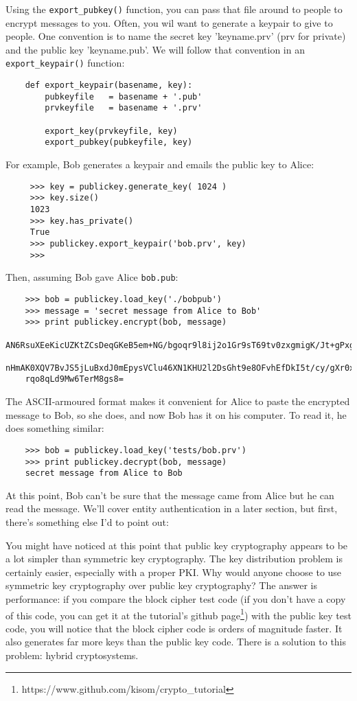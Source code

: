 \documentclass[letterpaper,10pt]{article}
\begin{document}
Using the \verb|export_pubkey()| function, you can pass that file
around to people to encrypt messages to you. Often, you wil want to generate a 
keypair to give to people. One convention is to name the secret key 
'keyname.prv' (prv for private) and the public key 'keyname.pub'. We will
follow that convention in an \verb|export_keypair()| function:
\begin{verbatim}
    def export_keypair(basename, key):
        pubkeyfile   = basename + '.pub'
        prvkeyfile   = basename + '.prv'

        export_key(prvkeyfile, key)
        export_pubkey(pubkeyfile, key)
\end{verbatim}

For example, Bob generates a keypair and emails the public key to Alice:
\begin{verbatim}
     >>> key = publickey.generate_key( 1024 )
     >>> key.size()
     1023
     >>> key.has_private()
     True
     >>> publickey.export_keypair('bob.prv', key)
     >>> 
\end{verbatim}

Then, assuming Bob gave Alice \verb|bob.pub|:
\begin{verbatim}
    >>> bob = publickey.load_key('./bobpub')
    >>> message = 'secret message from Alice to Bob'
    >>> print publickey.encrypt(bob, message)
    AN6RsuXEeKicUZKtZCsDeqGKeB5em+NG/bgoqr9l8ij2o1Gr9sT69tv0zxgmigK/Jt+gPxg/EDu61
    nHmAK0XQV7BvJS5jLuBxdJ0mEpysVClu46XN1KHU2l2DsGht9e8OFvhEfDkI5t/cy/gXr0xz/EUi
    rqo8qLd9Mw6TerM8gs8=
\end{verbatim}

The ASCII-armoured format makes it convenient for Alice to paste the encrypted
message to Bob, so she does, and now Bob has it on his computer. To read it, he
does something similar:
\begin{verbatim}
    >>> bob = publickey.load_key('tests/bob.prv')
    >>> print publickey.decrypt(bob, message)
    secret message from Alice to Bob
\end{verbatim}

At this point, Bob can't be sure that the message came from Alice but he can 
read the message. We'll cover entity authentication in a later section, but
first, there's something else I'd to point out:

You might have noticed at this point that public key cryptography appears to
be a lot simpler than symmetric key cryptography. The key distribution problem
is certainly easier, especially with a proper PKI. Why would anyone choose to
use symmetric key cryptography over public key cryptography? The answer is
performance: if you compare the block cipher test code (if you don't have a 
copy of this code, you can get it at the tutorial's 
github page\footnote{https://www.github.com/kisom/crypto\_tutorial}) with the public
key test code, you will notice that the block cipher code is orders of magnitude
faster. It also generates far more keys than the public key code. There is a 
solution to this problem: hybrid cryptosystems.
\end{document}

